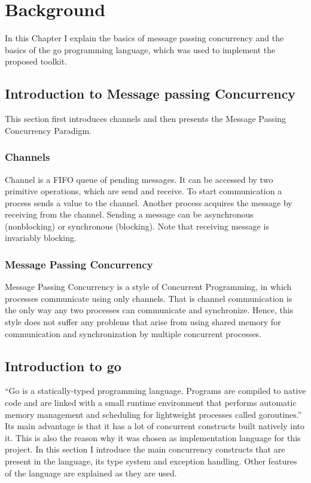 \section{Background}
\label{sec:background}
In this Chapter I explain the basics of message passing concurrency and 
the basics of the go programming language, which was used to implement 
the proposed toolkit.

\subsection{Introduction to Message passing Concurrency}
This section first introduces channels and then presents the Message
Passing Concurrency Paradigm.

\subsubsection{Channels}
Channel is a FIFO queue of pending messages. It can be accessed by two
primitive operations, which are send and receive. To start communication
a process sends a value to the channel. Another process acquires the message
by receiving from the channel. Sending a message can be asynchronous (nonblocking)
or synchronous (blocking). Note that receiving message is invariably blocking.
\cite[293]{book:foundations}

\subsubsection{Message Passing Concurrency}
Message Passing Concurrency is a style of Concurrent Programming, in which
processes communicate using only channels. That is channel communication is 
the only way any two processes can communicate and synchronize. 
Hence, this style does not 
suffer any problems that arise from using shared memory for communication 
and synchronization by multiple concurrent processes.

\subsection{Introduction to go}
``Go is a statically-typed programming language. Programs are compiled 
to native code and are linked with a small runtime environment that performs 
automatic memory management and scheduling for lightweight processes called 
goroutines.'' \cite[2]{whitehead} Its main advantage is 
that it has a lot of concurrent constructs built natively into it.
This is also the reason why it was chosen as implementation language 
for this project.
In this section I introduce the main concurrency constructs that are
present in the language, its type system and exception handling. Other 
features of the language are explained as they are used.

